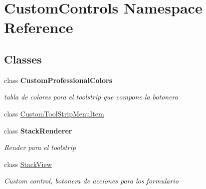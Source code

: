 \hypertarget{namespace_custom_controls}{}\section{Custom\+Controls Namespace Reference}
\label{namespace_custom_controls}
\subsection*{Classes}
\begin{DoxyCompactItemize}
\item 
class {\bfseries Custom\+Professional\+Colors}
\begin{DoxyCompactList}\small\item\em tabla de colores para el toolstrip que compone la botonera \end{DoxyCompactList}\item 
class \hyperlink{class_custom_controls_1_1_custom_tool_strip_menu_item}{Custom\+Tool\+Strip\+Menu\+Item}
\item 
class {\bfseries Stack\+Renderer}
\begin{DoxyCompactList}\small\item\em Render para el toolstrip \end{DoxyCompactList}\item 
class \hyperlink{class_custom_controls_1_1_stack_view}{Stack\+View}
\begin{DoxyCompactList}\small\item\em Custom control, botonera de acciones para los formulario \end{DoxyCompactList}\end{DoxyCompactItemize}
